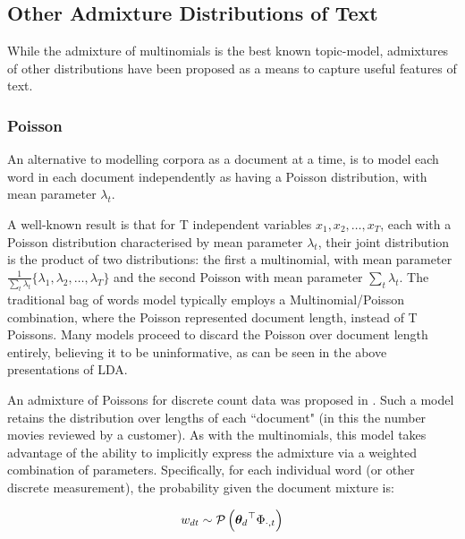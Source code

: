 

\subsection{Other Admixture Distributions of Text}

While the admixture of multinomials is the best known topic-model, admixtures of other distributions have been proposed as a means to capture useful features of text.

%
%

\subsubsection{Poisson}
An alternative to modelling corpora as a document at a time, is to model each word in each document independently as having a Poisson distribution, with mean parameter $\lambda_t$. 

A well-known result\cite{Bishop2006}\cite{Inouye2014} is that for T independent variables $x_1, x_2, \ldots, x_T$, each with a Poisson distribution characterised by mean parameter $\lambda_t$, their joint distribution is the product of two distributions: the first a multinomial, with mean parameter $\frac{1}{\sum_t \lambda_t} \{\lambda_1, \lambda_2, \ldots, \lambda_T\}$ and the second Poisson with mean parameter $\sum_t \lambda_t$. The traditional bag of words model typically employs a Multinomial/Poisson combination, where the Poisson represented document length, instead of T Poissons. Many models proceed to discard the Poisson over document length entirely, believing it to be uninformative, as can be seen in the above presentations of LDA.

An admixture of Poissons for discrete count data was proposed in \cite{Gopalan2013}. Such a model retains the distribution over lengths of each ``document" (in this the number movies reviewed by a customer). As with the multinomials, this model takes advantage of the ability to implicitly express the admixture via a weighted combination of parameters. Specifically, for each individual word (or other discrete measurement), the probability given the document mixture is:


\begin{align}
w_{dt} \sim \mathcal{P} \left( {{ \bm \theta_d }^\top\Phi_{\cdot,t}} \right)
\end{align}

